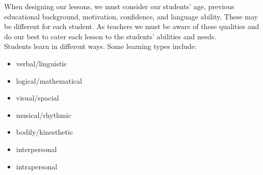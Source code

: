 \begin{figure}[h!]
\centering
\setlength\fboxsep{0pt}
\setlength\fboxrule{2pt}
\end{figure}

When designing our lessons, we must consider our students' age, previous educational background, motivation, confidence, and language ability.  These may be different for each student.  As teachers we must be aware of these qualities and do our best to cater each lesson to the students' abilities and needs.\\

Students learn in different ways.  Some learning types include: 
\begin{itemize}
\item verbal/linguistic
\item logical/mathematical
\item visual/spacial
\item musical/rhythmic
\item bodily/kinesthetic
\item interpersonal 
\item intrapersonal 
\end{itemize}



